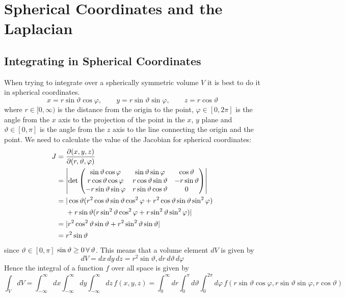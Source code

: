 \documentclass{article}
\begin{document}
    \section{Spherical Coordinates and the Laplacian}
    \subsection{Integrating in Spherical Coordinates}
    When trying to integrate over a spherically symmetric volume \(V\) it is best to do it in spherical coordinates.
    \[x = r\sin\vartheta\cos\varphi,\qquad y = r\sin\vartheta\sin\varphi,\qquad z = r\cos\vartheta\]
    where \(r \in [0, \infty)\) is the distance from the origin to the point, \(\varphi \in [0, 2\pi]\) is the angle from the \(x\) axis to the projection of the point in the \(x\), \(y\) plane and \(\vartheta \in [0, \pi]\) is the angle from the \(z\) axis to the line connecting the origin and the point.
    We need to calculate the value of the Jacobian for spherical coordinates:
    \begin{align*}
        J &= \pdv{(x, y, z)}{(r, \vartheta, \varphi)}\\
        &= \left | \det
        \begin{pmatrix}
            \sin\vartheta\cos\varphi & \sin\vartheta\sin\varphi & \cos\vartheta\\
            r\cos\vartheta\cos\varphi & r\cos\vartheta\sin\vartheta & -r\sin\vartheta\\
            -r\sin\vartheta\sin\varphi & r\sin\vartheta\cos\vartheta & 0
        \end{pmatrix}
        \right |\\
        & = | \cos\vartheta(r^2\cos\vartheta\sin\vartheta\cos^2\varphi + r^2\cos\vartheta\sin\vartheta\sin^2\varphi) \\
        &\hphantom{=|} + r\sin\vartheta (r\sin^2\vartheta\cos^2\varphi + r\sin^2\vartheta\sin^2\varphi)|\\
        & = |r^2\cos^2\vartheta\sin\vartheta + r^2\sin^2\vartheta\sin\vartheta|\\
        & = r^2\sin\vartheta
    \end{align*}
    since \(\vartheta\in[0, \pi]\) \(\sin\vartheta \ge 0\,\forall\, \vartheta\).
    This means that a volume element \(dV\) is given by
    \[dV = dx\,dy\,dz = r^2\sin\vartheta,dr\,d\vartheta\,d\varphi\]
    Hence the integral of a function \(f\) over all space is given by
    \[\int_V dV = \int_{-\infty}^\infty dx \int_{-\infty}^\infty dy \int_{-\infty}^\infty dz\,f(x, y, z) = \int_0^\infty dr\int_0^\pi d\vartheta\int_0^{2\pi} d\varphi\, f(r\sin\vartheta\cos\varphi, r\sin\vartheta\sin\varphi, r\cos\vartheta)\]
    
\end{document}

